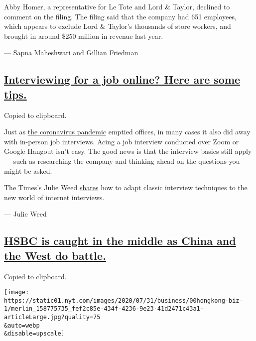 Abby Homer, a representative for Le Tote and Lord \& Taylor, declined to
comment on the filing. The filing said that the company had 651
employees, which appears to exclude Lord \& Taylor's thousands of store
workers, and brought in around \$250 million in revenue last year.

--- \href{https://www.nytimes.com/by/sapna-maheshwari}{Sapna Maheshwari}
and Gillian Friedman

\hypertarget{interviewing-for-a-job-online-here-are-some-tips}{%
\subsection{\texorpdfstring{\protect\hyperlink{interviewing-for-a-job-online-here-are-some-tips}{Interviewing
for a job online? Here are some
tips.}}{Interviewing for a job online? Here are some tips.}}\label{interviewing-for-a-job-online-here-are-some-tips}}

Copied to clipboard.

Just as \href{https://www.nytimes.com/news-event/coronavirus}{the
coronavirus pandemic} emptied offices, in many cases it also did away
with in-person job interviews. Acing a job interview conducted over Zoom
or Google Hangout isn't easy. The good news is that the interview basics
still apply --- such as researching the company and thinking ahead on
the questions you might be asked.

The Times's Julie Weed
\href{https://www.nytimes.com/2020/08/03/business/online-job-interview-tips.html}{shares}
how to adapt classic interview techniques to the new world of internet
interviews.

--- Julie Weed

\hypertarget{hsbc-is-caught-in-the-middle-as-china-and-the-west-do-battle}{%
\subsection{\texorpdfstring{\protect\hyperlink{hsbc-is-caught-in-the-middle-as-china-and-the-west-do-battle}{HSBC
is caught in the middle as China and the West do
battle.}}{HSBC is caught in the middle as China and the West do battle.}}\label{hsbc-is-caught-in-the-middle-as-china-and-the-west-do-battle}}

Copied to clipboard.

\texttt{[image: https://static01.nyt.com/images/2020/07/31/business/00hongkong-biz-1/merlin\_158775735\_fef2c85e-434f-4236-9e23-41d2471c43a1-articleLarge.jpg?quality=75\\\&auto=webp\\\&disable=upscale]}

